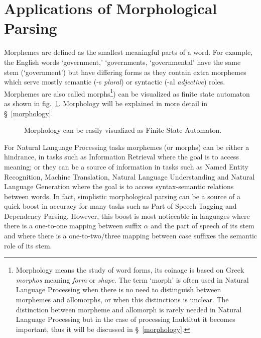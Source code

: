 \documentclass[runningheads,a4paper]{llncs}
\begin{document}
\section{Applications of Morphological Parsing}
\label{applications}
Morphemes are defined as the smallest meaningful parts of a word. For example, the English words `government,' `governments, `governmental' have the same stem (`government') but have differing forms as they contain extra morphemes which serve mostly semantic (-s \textit{plural}) or syntactic (-al \textit{adjective}) roles. Morphemes are also called morphs\footnote{Morphology means the study of word forms, its coinage is based on Greek \textit{morphos} meaning \textit{form} or \textit{shape}. The term `morph' is often used in Natural Language Processing when there is no need to distinguish between morphemes and allomorphs, or when this distinctions is unclear. The distinction between morpheme and allomorph is rarely needed in Natural Language Processing but in the case of processing Inuktitut it becomes important, thus it will be discussed in \S~\ref{morphology}.}) can be visualized as finite state automaton as shown in fig.~\ref{fig:fsaenglish}. Morphology will be explained in more detail in \S~\ref{morphology}. 

\begin{figure}[h]
	
%
%
%
%
%
%
%
% 
%
%
%
%

	\caption{Morphology can be easily visualized as Finite State Automaton.}
	\label{fig:fsaenglish}
\end{figure}

For Natural Language Processing tasks morphemes (or morphs) can be either a hindrance, in tasks such as Information Retrieval where the goal is to access meaning; or they can be a source of information in tasks such as Named Entity Recognition, Machine Translation, Natural Language Understanding and Natural Language Generation where the goal is to access syntax-semantic relations between words. In fact, simplistic morphological parsing can be a source of a quick boost in accuracy for many tasks such as Part of Speech Tagging and Dependency Parsing. However, this boost is most noticeable in languages where there is a one-to-one mapping between suffix $\alpha$ and the part of speech of its stem and where there is a one-to-two/three mapping between case suffixes the semantic role of its stem. 
\end{document}
